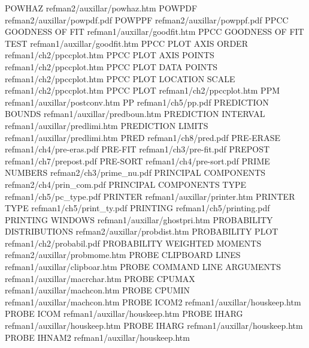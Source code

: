 POWHAZ                                  refman2/auxillar/powhaz.htm
POWPDF                                  refman2/auxillar/powpdf.pdf
POWPPF                                  refman2/auxillar/powppf.pdf
PPCC GOODNESS OF FIT                    refman1/auxillar/goodfit.htm
PPCC GOODNESS OF FIT TEST               refman1/auxillar/goodfit.htm
PPCC PLOT AXIS ORDER                    refman1/ch2/ppccplot.htm
PPCC PLOT AXIS POINTS                   refman1/ch2/ppccplot.htm
PPCC PLOT DATA POINTS                   refman1/ch2/ppccplot.htm
PPCC PLOT LOCATION SCALE                refman1/ch2/ppccplot.htm
PPCC PLOT                               refman1/ch2/ppccplot.htm
PPM                                     refman1/auxillar/postconv.htm
PP                                      refman1/ch5/pp.pdf
PREDICTION BOUNDS                       refman1/auxillar/predboun.htm
PREDICTION INTERVAL                     refman1/auxillar/predlimi.htm
PREDICTION LIMITS                       refman1/auxillar/predlimi.htm
PRED                                    refman1/ch8/pred.pdf
PRE-ERASE                               refman1/ch4/pre-eras.pdf
PRE-FIT                                 refman1/ch3/pre-fit.pdf
PREPOST                                 refman1/ch7/prepost.pdf
PRE-SORT                                refman1/ch4/pre-sort.pdf
PRIME NUMBERS                           refman2/ch3/prime_nu.pdf
PRINCIPAL COMPONENTS                    refman2/ch4/prin_com.pdf
PRINCIPAL COMPONENTS TYPE               refman1/ch5/pc_type.pdf
PRINTER                                 refman1/auxillar/printer.htm
PRINTER TYPE                            refman1/ch5/print_ty.pdf
PRINTING                                refman1/ch5/printing.pdf
PRINTING WINDOWS                        refman1/auxillar/ghostpri.htm
PROBABILITY DISTRIBUTIONS               refman2/auxillar/probdist.htm
PROBABILITY PLOT                        refman1/ch2/probabil.pdf
PROBABILITY WEIGHTED MOMENTS            refman2/auxillar/probmome.htm
PROBE CLIPBOARD LINES                   refman1/auxillar/clipboar.htm
PROBE COMMAND LINE ARGUMENTS            refman1/auxillar/macrchar.htm
PROBE CPUMAX                            refman1/auxillar/machcon.htm
PROBE CPUMIN                            refman1/auxillar/machcon.htm
PROBE ICOM2                             refman1/auxillar/houskeep.htm
PROBE ICOM                              refman1/auxillar/houskeep.htm
PROBE IHARG                             refman1/auxillar/houskeep.htm
PROBE IHARG                             refman1/auxillar/houskeep.htm
PROBE IHNAM2                            refman1/auxillar/houskeep.htm
